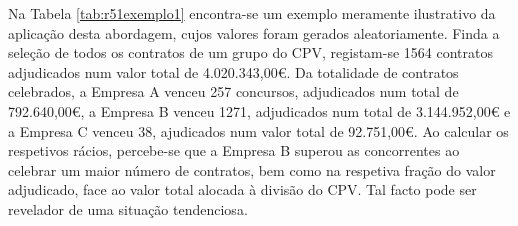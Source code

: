 Na Tabela \ref{tab:r51exemplo1} encontra-se um exemplo meramente ilustrativo da aplicação desta abordagem, cujos valores foram gerados aleatoriamente. Finda a seleção de todos os contratos de um grupo do CPV, registam-se 1564 contratos adjudicados num valor total de 4.020.343,00€. Da totalidade de contratos celebrados, a Empresa A venceu 257 concursos, adjudicados num total de 792.640,00€, a Empresa B venceu 1271, adjudicados num total de 3.144.952,00€ e a Empresa C venceu 38, ajudicados num valor total de 92.751,00€. Ao calcular os respetivos rácios, percebe-se que a Empresa B superou as concorrentes ao celebrar um maior número de contratos, bem como na respetiva fração do valor adjudicado, face ao valor total alocada à divisão do CPV. Tal facto pode ser revelador de uma situação tendenciosa.


\begin{table}[H]
	\centering
	\renewcommand{\arraystretch}{1.15}
	\setlength{\tabcolsep}{15pt}
\end{table}
